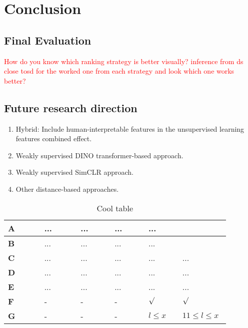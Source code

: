 \chapter{Conclusion}

\section{Final Evaluation}
\textcolor{red}{How do you know which ranking strategy is better visually? inference from ds close tosd for the worked one from each strategy and look which one works better?}

\section{Future research direction}

\begin{enumerate}
    \item Hybrid: Include human-interpretable features in the unsupervised learning features combined effect.
    \item Weakly supervised DINO transformer-based approach.
    \item Weakly supervised SimCLR approach.
    \item Other distance-based approaches.
\end{enumerate}



\lipsum[3]
\begin{table}[H]
	\begin{center}
		\def\arraystretch{2}
		\begin{tabular}{p{0.155\linewidth}|p{0.15\linewidth}|p{0.145\linewidth}|p{0.14\linewidth}|p{0.14\linewidth}|p{0.15\linewidth}}
			\textbf{A}& ...	&...	&... &...  \\
			\hline \textbf{B} &...&...&... &... \\
			\hline \textbf{C} & ... &... &... &... &... \\
			\hline \textbf{D} & ... &...&... &... &... \\
			\hline \textbf{E} & ... &... &... &... &... \\
			\hline \textbf{F} & - &- &- &$\surd$  &$\surd$  \\
			\hline \textbf{G} & - & -& - & $l \leq x$ & $11 \leq l \leq x$\\
		\end{tabular}
	\end{center}
	\caption{Cool table}
	\label{tab:cool_table}
\end{table}